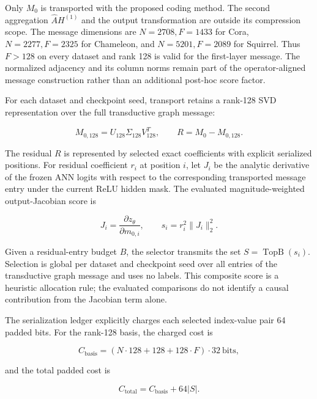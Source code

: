 \documentclass{article}
\begin{document}
Only \(M_0\) is transported with the proposed coding method. The second aggregation \(\hat{A}H^{(1)}\) and the output transformation are outside its compression scope. The message dimensions are \(N=2708,F=1433\) for Cora, \(N=2277,F=2325\) for Chameleon, and \(N=5201,F=2089\) for Squirrel. Thus \(F>128\) on every dataset and rank 128 is valid for the first-layer message. The normalized adjacency and its column norms remain part of the operator-aligned message construction rather than an additional post-hoc score factor.

For each dataset and checkpoint seed, transport retains a rank-128 SVD representation over the full transductive graph message:

\begin{equation}
M_{0,128}=U_{128}\Sigma_{128}V_{128}^{T}, \qquad R=M_0-M_{0,128}.
\end{equation}

The residual \(R\) is represented by selected exact coefficients with explicit serialized positions. For residual coefficient \(r_i\) at position \(i\), let \(J_i\) be the analytic derivative of the frozen ANN logits with respect to the corresponding transported message entry under the current ReLU hidden mask. The evaluated magnitude-weighted output-Jacobian score is

\begin{equation}
J_i=\frac{\partial z_{\theta}}{\partial m_{0,i}}, \qquad s_i=r_i^2\lVert J_i\rVert_2^2.
\end{equation}

Given a residual-entry budget \(B\), the selector transmits the set \(S=\operatorname{TopB}(s_i)\). Selection is global per dataset and checkpoint seed over all entries of the transductive graph message and uses no labels. This composite score is a heuristic allocation rule; the evaluated comparisons do not identify a causal contribution from the Jacobian term alone.

The serialization ledger explicitly charges each selected index-value pair 64 padded bits. For the rank-128 basis, the charged cost is

\begin{equation}
C_{\mathrm{basis}}=(N\cdot128+128+128\cdot F)\cdot32\ \mathrm{bits},
\end{equation}

and the total padded cost is

\begin{equation}
C_{\mathrm{total}}=C_{\mathrm{basis}}+64|S|.
\end{equation}
\end{document}
